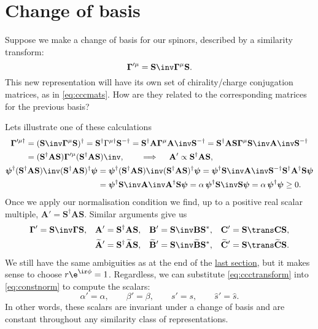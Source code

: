 \documentclass[11pt]{article}
\newcommand{\invd}{^{-\dag}}
\newcommand{\Gammab}{\boldsymbol{\Gamma}}
\newcommand{\mud}{{\mu\dag}}
\renewcommand{\S}{\mathbf{S}}
\newcommand{\A}{\mathbf{A}}
\newcommand{\B}{\mathbf{B}}
\renewcommand{\C}{\mathbf{C}}
\newcommand{\At}{\widetilde{\mathbf{A}}}
\newcommand{\Bt}{\widetilde{\mathbf{B}}}
\newcommand{\Ct}{\widetilde{\mathbf{C}}}
\newcommand{\psib}{\boldsymbol{\psi}}
\begin{document}

\section{Change of basis}\label{sec:basis}

Suppose we make a change of basis for our spinors, described by a similarity transform:
%
\begin{equation*}
  \Gammab'^{\mu} = \S\inv \Gammab^\mu \S.
\end{equation*}
%
This new representation will have its own set of chirality/charge conjugation matrices, as in \cref{eq:cccmats}.
How are they related to the corresponding matrices for the previous basis?

Lets illustrate one of these calculations
%
\begin{equation*}
\begin{gathered}
\begin{aligned}
  \Gammab'^\mud 
    &= (\S\inv \Gammab^\mu \S)^\dag 
    = \S^\dag \Gamma^\mud \S\invd 
    = \S^\dag \A \Gammab^\mu \A\inv \S\invd 
    = \S^\dag \A \S \Gammab^\mu \S\inv \A\inv \S\invd \\
    &= (\S^\dag \A \S) \Gammab'^\mu (\S^\dag \A \S)\inv,
    \qquad \implies \quad 
    \A' \propto \S^\dag \A \S, 
\end{aligned}
\\
\begin{aligned}
  \psib^\dag (\S^\dag \A \S)\inv (\S^\dag \A \S)^\dag \psib 
    &= \psib^\dag (\S^\dag \A \S)\inv (\S^\dag \A \S)^\dag \psib  
     = \psib^\dag \S\inv \A\inv \S\invd \S^\dag \A^\dag \S \psib \\
    &= \psib^\dag \S\inv \A\inv \A^\dag \S \psib 
     = \alpha\, \psib^\dag \S\inv \S \psib 
     = \alpha\, \psib^\dag \psib 
     \geq 0.
\end{aligned}
\end{gathered}
\end{equation*}
%
Once we apply our normalisation condition we find, up to a positive real scalar multiple, 
\( \A' = \S^\dag \A \S \).
Similar arguments give us
%
\begin{equation}\label{eq:ccctransform}
\begin{aligned}
  \Gammab' &= \S\inv \Gammab \S, &
  \A' &= \S^\dag \A \S, &
  \B' &= \S\inv \B \S^\ast, &
  \C' &= \S\trans \C \S, 
\\ &&
  \At' &= \S^\dag \At \S, &
  \Bt' &= \S\inv \Bt \S^\ast, &
  \Ct' &= \S\trans \Ct \S.
\end{aligned}
\end{equation}
%
We still have the same ambiguities as at the end of the \hyperref[eq:constnorm]{last section}, but it makes sense to choose \( r \e^{\ir\phi} = 1 \).
Regardless, we can substitute \cref{eq:ccctransform} into \cref{eq:constnorm} to compute the scalars:
%
\begin{equation*}
  \alpha' = \alpha, \qquad
  \beta' = \beta, \qquad
  s' = s, \qquad
  \hat{s}' = \hat{s}.
\end{equation*}
%
In other words, these scalars are invariant under a change of basis and are constant throughout any similarity class of representations.
\end{document}
